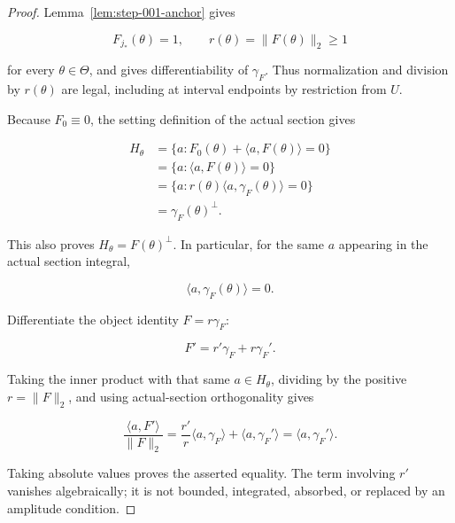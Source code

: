 \begin{proof}
Lemma~\ref{lem:step-001-anchor} gives

\begin{equation}
\label{eq:appendix-display-218}
F_{j_*}(\theta)=1,
\qquad
r(\theta)=\lVert F(\theta)\rVert_2\geq1
\end{equation}

for every \(\theta\in\Theta\), and gives differentiability of \(\gamma_F\). Thus normalization and division by
\(r(\theta)\) are legal, including at interval endpoints by restriction from \(U\).

Because \(F_0\equiv0\), the setting definition of the actual section gives

\begin{equation}
\label{eq:appendix-display-219}
\begin{aligned}
H_\theta
&=\{a:F_0(\theta)+\langle a,F(\theta)\rangle=0\}\\
&=\{a:\langle a,F(\theta)\rangle=0\}\\
&=\{a:r(\theta)\langle a,\gamma_F(\theta)\rangle=0\}\\
&=\gamma_F(\theta)^\perp.
\end{aligned}
\end{equation}

This also proves \(H_\theta=F(\theta)^\perp\). In particular, for the same \(a\) appearing in the actual
section integral,

\begin{equation}
\label{eq:appendix-display-220}
\langle a,\gamma_F(\theta)\rangle=0.
\end{equation}

Differentiate the object identity \(F=r\gamma_F\):

\begin{equation}
\label{eq:appendix-display-221}
F'=r'\gamma_F+r\gamma_F'.
\end{equation}

Taking the inner product with that same \(a\in H_\theta\), dividing by the positive
\(r=\lVert F\rVert_2\), and using actual-section orthogonality gives

\begin{equation}
\label{eq:appendix-display-222}
\frac{\langle a,F'\rangle}{\lVert F\rVert_2}
=\frac{r'}r\langle a,\gamma_F\rangle+\langle a,\gamma_F'\rangle
=\langle a,\gamma_F'\rangle.
\end{equation}

Taking absolute values proves the asserted equality. The term involving \(r'\) vanishes algebraically; it is
not bounded, integrated, absorbed, or replaced by an amplitude condition. 
\end{proof}

